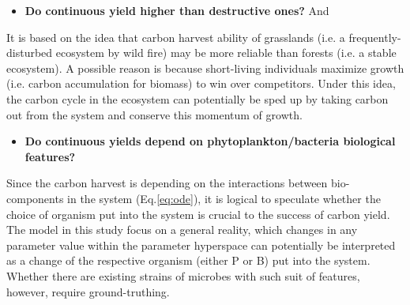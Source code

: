 \documentclass[../thesis.tex]{subfiles} %
\begin{document}
\begin{itemize}
    \item \textbf{
    Do continuous yield higher than destructive ones?
    } And
\end{itemize}

It is based on the idea that carbon harvest ability of grasslands (i.e. a frequently-disturbed ecosystem by wild fire) may be more reliable than forests (i.e. a stable ecosystem).\autocite{dass2018grasslands}  A possible reason is because short-living individuals maximize growth (i.e. carbon accumulation for biomass) to win over competitors.  Under this idea, the carbon cycle in the ecosystem can potentially be sped up by taking carbon out from the system and conserve this momentum of growth.

\begin{itemize}
    \item \textbf{
    Do continuous yields depend on phytoplankton/bacteria biological features?
    }
\end{itemize}

Since the carbon harvest is depending on the interactions between bio-components in the system (Eq.\ref{eq:ode}), it is logical to speculate whether the choice of organism put into the system is crucial to the success of carbon yield.  The model in this study focus on a general reality, which changes in any parameter value within the parameter hyperspace can potentially be interpreted as a change of the respective organism (either P or B) put into the system.  Whether there are existing strains of microbes with such suit of features, however, require ground-truthing.
\end{document}
